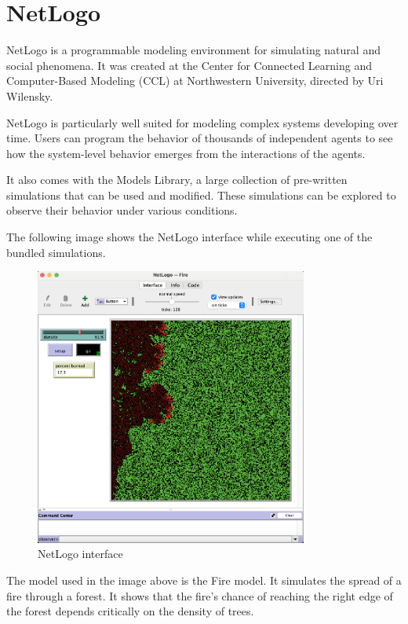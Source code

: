 \documentclass[12pt,a4paper,openright,twoside]{book}
\begin{document}
\section{NetLogo}

NetLogo is a programmable modeling environment for simulating natural and social phenomena. It was created at the Center
for Connected Learning and Computer-Based Modeling (CCL) at Northwestern University, directed by Uri Wilensky.

NetLogo is particularly well suited for modeling complex systems developing over time. 
Users can program the behavior of thousands of independent agents to see how the system-level behavior emerges from the interactions of the agents.

It also comes with the Models Library, a large collection of pre-written simulations that can be used and modified.
These simulations can be explored to observe their behavior under various conditions.

The following image shows the NetLogo interface while executing one of the bundled simulations.

\begin{figure}[H]
  \centering
  \includegraphics[width=0.8\textwidth]{figures/NetLogo-interface.png}
  \caption{NetLogo interface}
\end{figure}

The model used in the image above is the Fire model.
It simulates the spread of a fire through a forest. It shows that the fire's chance of reaching the right edge
of the forest depends critically on the density of trees.
\end{document}
